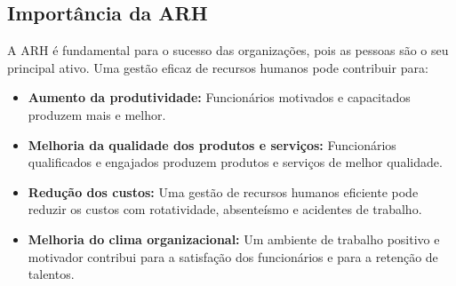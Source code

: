 \documentclass{article}
\begin{document}
\subsection{Importância da ARH}
A ARH é fundamental para o sucesso das organizações, pois as pessoas são o seu principal ativo. Uma gestão eficaz de recursos humanos pode contribuir para:
\begin{itemize}
    \item \textbf{Aumento da produtividade:} Funcionários motivados e capacitados produzem mais e melhor.
    \item \textbf{Melhoria da qualidade dos produtos e serviços:} Funcionários qualificados e engajados produzem produtos e serviços de melhor qualidade.
    \item \textbf{Redução dos custos:} Uma gestão de recursos humanos eficiente pode reduzir os custos com rotatividade, absenteísmo e acidentes de trabalho.
    \item \textbf{Melhoria do clima organizacional:} Um ambiente de trabalho positivo e motivador contribui para a satisfação dos funcionários e para a retenção de talentos.
\end{itemize}
\end{document}
